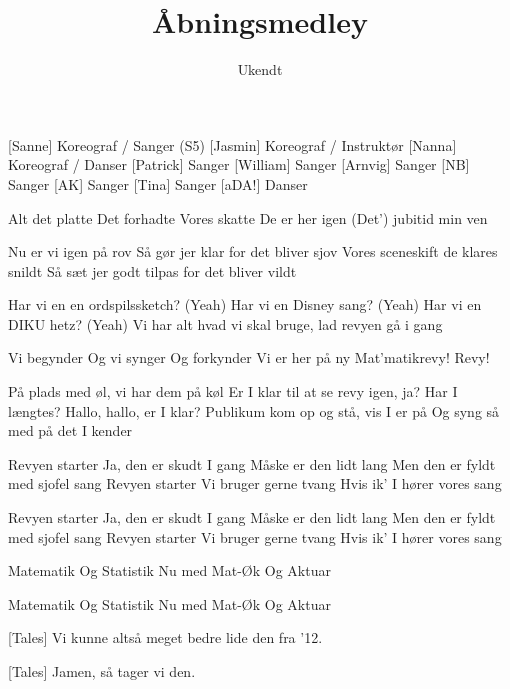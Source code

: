 \documentclass[a4paper,11pt]{article}
\title{Åbningsmedley}
\author{Ukendt}
\begin{document}
\maketitle

\begin{roles}
[Sanne] Koreograf / Sanger (S5)
[Jasmin] Koreograf / Instruktør
[Nanna] Koreograf / Danser
[Patrick] Sanger
[William] Sanger
[Arnvig] Sanger
[NB] Sanger
[AK] Sanger
[Tina] Sanger
[aDA!] Danser
\end{roles}

\begin{song}
 Alt det platte
 Det forhadte
 Vores skatte
 De er her igen
 (Det') jubitid min ven

 Nu er vi igen på rov
Så gør jer klar for det bliver sjov
Vores sceneskift de klares snildt
Så sæt jer godt tilpas for det bliver vildt

 Har vi en en ordspilssketch? (Yeah)
Har vi en Disney sang? (Yeah)
Har vi en DIKU hetz? (Yeah)
Vi har alt hvad vi skal bruge, lad revyen gå i gang

 Vi begynder
Og vi synger
Og forkynder
Vi er her på ny
Mat'matikrevy!
Revy!


 På plads med øl, vi har dem på køl
 Er I klar til at se revy igen, ja? Har I længtes?
 Hallo, hallo, er I klar?
 Publikum kom op og stå, vis I er på
 Og syng så med på det I kender

 Revyen starter
Ja, den er skudt I gang
Måske er den lidt lang
Men den er fyldt med sjofel sang
Revyen starter
Vi bruger gerne tvang
Hvis ik' I hører vores sang

 Revyen starter
Ja, den er skudt I gang
Måske er den lidt lang
Men den er fyldt med sjofel sang
Revyen starter
Vi bruger gerne tvang
Hvis ik' I hører vores sang

 Matematik
Og Statistik
Nu med Mat-Øk
Og Aktuar

 Matematik
Og Statistik
Nu med Mat-Øk
Og Aktuar


[Tales] Vi kunne altså meget bedre lide den fra '12.

[Tales] Jamen, så tager vi den.


\end{song}
\end{document}
